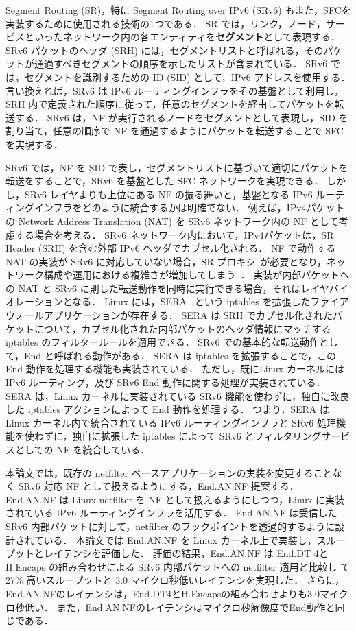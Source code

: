Segment Routing (SR)，特に Segment Routing over IPv6 (SRv6) もまた，SFCを実装するために使用される技術の1つである．
SR では，リンク，ノード，サービスといったネットワーク内の各エンティティを\textbf{セグメント}として表現する．
SRv6 パケットのヘッダ (SRH) には，セグメントリストと呼ばれる，そのパケットが通過すべきセグメントの順序を示したリストが含まれている．
SRv6 では，セグメントを識別するための ID (SID) として，IPv6 アドレスを使用する．
言い換えれば，SRv6 は IPv6 ルーティングインフラをその基盤として利用し，SRH 内で定義された順序に従って，任意のセグメントを経由してパケットを転送する．
SRv6 は，NF が実行されるノードをセグメントとして表現し，SID を割り当て，任意の順序で NF を通過するようにパケットを転送することで SFC を実現する．

SRv6 では，NF を SID で表し，セグメントリストに基づいて適切にパケットを転送をすることで，SRv6 を基盤とした SFC ネットワークを実現できる．
しかし，SRv6 レイヤよりも上位にある NF の振る舞いと，基盤となる IPv6 ルーティングインフラをどのように統合するかは明確でない．
例えば，IPv4パケットの Network Address Translation (NAT) を SRv6 ネットワーク内の NF として考慮する場合を考える．
SRv6 ネットワーク内において，IPv4パケットは，SR Header (SRH) を含む外部 IPv6 ヘッダでカプセル化される．
NF で動作する NAT の実装が SRv6 に対応していない場合，SR プロキシ~\cite{ietf-spring-sr-service-programming-08}が必要となり，ネットワーク構成や運用における複雑さが増加してしまう~\cite{draft-scexp}．
実装が内部パケットへの NAT と SRv6 に則した転送動作を同時に実行できる場合，それはレイヤバイオレーションとなる． 
Linux には，SERA~\cite{sera} という iptables を拡張したファイアウォールアプリケーションが存在する．
SERA は SRH でカプセル化されたパケットについて，カプセル化された内部パケットのヘッダ情報にマッチする iptables のフィルタールールを適用できる．
SRv6 での基本的な転送動作として，End と呼ばれる動作がある．
SERA は iptables を拡張することで，この End 動作を処理する機能も実装されている．
ただし，既にLinux カーネルには IPv6 ルーティング，及び SRv6 End 動作に関する処理が実装されている．
SERA は，Linux カーネルに実装されている SRv6 機能を使わずに，独自に改良した iptables アクションによって End 動作を処理する．
つまり，SERA は Linux カーネル内で統合されている IPv6 ルーティングインフラと SRv6 処理機能を使わずに，独自に拡張した iptables によって SRv6 とフィルタリングサービスとしての NF を統合している．

本論文では，既存の netfilter ベースアプリケーションの実装を変更することなく SRv6 対応 NF として扱えるようにする，End.AN.NF 提案する．
End.AN.NF は Linux netfilter を NF として扱えるようにしつつ，Linux に実装されている IPv6 ルーティングインフラを活用する．
End.AN.NF は受信した SRv6 内部パケットに対して，netfilter のフックポイントを透過的するように設計されている．
本論文では End.AN.NF を Linux カーネル上で実装し，スループットとレイテンシを評価した．
評価の結果，End.AN.NF は End.DT 4と H.Encaps の組み合わせによる SRv6 内部パケットへの netfilter 適用と比較し て27\% 高いスループットと 3.0 マイクロ秒低いレイテンシを実現した．
さらに，End.AN.NFのレイテンシは，End.DT4とH.Encapsの組み合わせよりも3.0マイクロ秒低い．
また，End.AN.NFのレイテンシはマイクロ秒解像度でEnd動作と同じである．


